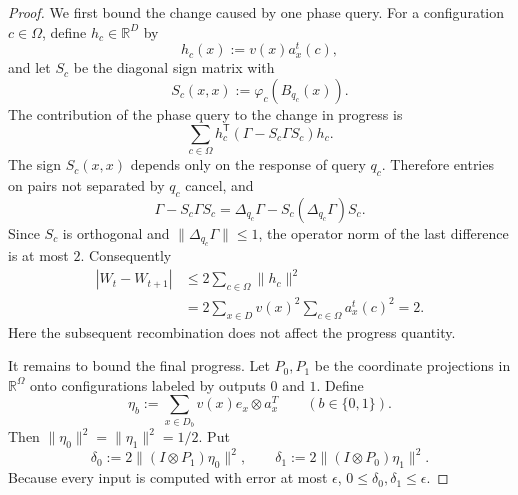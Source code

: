 \documentclass[11pt]{article}
\numberwithin{equation}{section}
\theoremstyle{remark}
\begin{document}
\begin{proof}
We first bound the change caused by one phase query. For a configuration
$c\in\Omega$, define $h_c\in\mathbb R^D$ by
\begin{equation}
    h_c(x):=v(x)a_x^t(c),
\end{equation}
and let $S_c$ be the diagonal sign matrix with
\begin{equation}
    S_c(x,x):=\varphi_c(B_{q_c}(x)).
\end{equation}
The contribution of the phase query to the change in progress is
\begin{equation}
    \sum_{c\in\Omega}
        h_c^{\mathsf T}
        (\Gamma-S_c\Gamma S_c)
        h_c.
\end{equation}
The sign $S_c(x,x)$ depends only on the response of query $q_c$. Therefore
entries on pairs not separated by $q_c$ cancel, and
\begin{equation}
    \Gamma-S_c\Gamma S_c
    =
    \Delta_{q_c}\Gamma
    -S_c(\Delta_{q_c}\Gamma)S_c.
\end{equation}
Since $S_c$ is orthogonal and
$\|\Delta_{q_c}\Gamma\|\leq1$, the operator norm of the last difference is
at most $2$. Consequently
\begin{equation}
\begin{aligned}
    |W_t-W_{t+1}|
    &\leq
    2\sum_{c\in\Omega}\|h_c\|^2\\
    &=
    2\sum_{x\in D}v(x)^2
        \sum_{c\in\Omega}a_x^t(c)^2
    =2.
\end{aligned}
\end{equation}
Here the subsequent recombination does not affect the progress quantity.

It remains to bound the final progress. Let $P_0,P_1$ be the coordinate
projections in $\mathbb R^\Omega$ onto configurations labeled by outputs $0$
and $1$. Define
\begin{equation}
    \eta_b
    :=
    \sum_{x\in D_b}v(x)e_x\otimes a_x^T
    \qquad (b\in\{0,1\}).
\end{equation}
Then $\|\eta_0\|^2=\|\eta_1\|^2=1/2$. Put
\begin{equation}
    \delta_0:=2\|(I\otimes P_1)\eta_0\|^2,
    \qquad
    \delta_1:=2\|(I\otimes P_0)\eta_1\|^2.
\end{equation}
Because every input is computed with error at most $\epsilon$,
$0\leq\delta_0,\delta_1\leq\epsilon$.


\end{proof}
\end{document}
